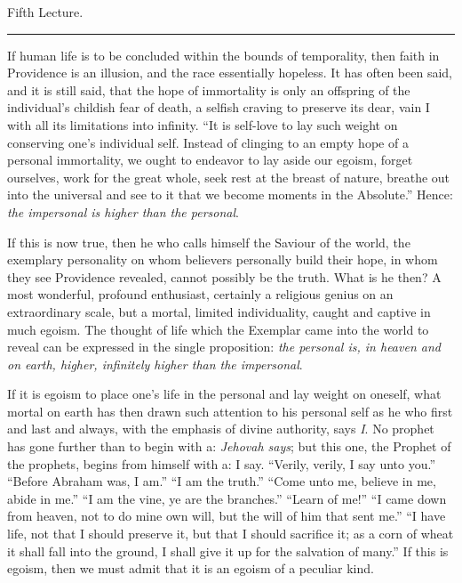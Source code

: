 \documentclass[12pt,a4paper,openany]{book}
\newcommand{\opage}[1]{\marginnote{\footnotesize\textit{[#1]}}}
\newcommand{\lecture}[1]{\clearpage\phantomsection\addcontentsline{toc}{chapter}{#1}\begin{center}{\large #1}\\[0.4em]\rule{3em}{0.4pt}\end{center}\medskip\noindent}
\begin{document}
\setcounter{footnote}{0}%
\lecture{Fifth Lecture.}\opage{70}If human life is to be concluded within the bounds of temporality,
then faith in Providence is an illusion, and the race essentially hopeless. It has often been said,
and it is still said, that the hope of immortality is only an offspring of the individual's childish
fear of death, a selfish craving to preserve its dear, vain I with all its limitations into infinity.
``It is self-love to lay such weight on conserving one's individual self. Instead of clinging
to an empty hope of a personal immortality, we ought to endeavor to lay aside our egoism, forget
ourselves, work for the great whole, seek rest at the breast of nature, breathe out into the universal
and see to it that we become moments in the Absolute.'' Hence: \emph{the impersonal
is higher than the personal}.

If this is now true, then he who calls himself the Saviour of the world, the exemplary personality
on whom believers personally build their hope, in whom they see Providence revealed, cannot possibly
be the truth. What is he then? A most wonderful, profound enthusiast, certainly a religious genius
on an extraordinary scale, but a mortal, limited individuality,
\setcounter{footnote}{0}%
\opage{71}caught and captive in much egoism. The thought of life which the Exemplar came into the world
to reveal can be expressed in the single proposition: \emph{the personal is, in
heaven and on earth, higher, infinitely higher
than the impersonal}.

If it is egoism to place one's life in the personal and lay weight on oneself, what mortal on earth
has then drawn such attention to his personal self as he who first and last and always, with the
emphasis of divine authority, says \emph{I}. No prophet has gone further than to begin with
a: \emph{Jehovah says}; but this one, the Prophet of the prophets, begins from himself with a: I say.
``Verily, verily, I say unto you.'' ``Before Abraham was, I am.'' ``I am the truth.'' ``Come unto me,
believe in me, abide in me.'' ``I am the vine, ye are the branches.'' ``Learn of me!'' ``I came down
from heaven, not to do mine own will, but the will of him that sent me.'' ``I have life, not that
I should preserve it, but that I should sacrifice it; as a corn of wheat it shall fall into the ground,
I shall give it up for the salvation of many.'' If this is egoism, then we must admit that it is an
egoism of a peculiar kind.
\end{document}
